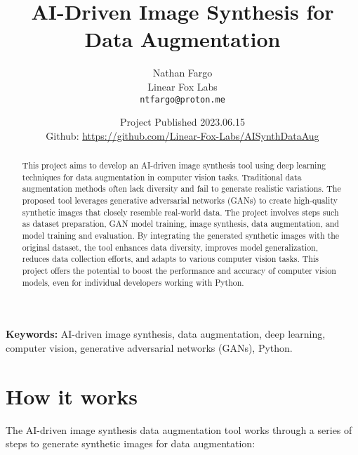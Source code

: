 \documentclass[11pt,a4paper]{article}
\title{AI-Driven Image Synthesis for Data Augmentation}
\author{Nathan Fargo\\
Linear Fox Labs\\
\texttt{ntfargo@proton.me}}
\date{Project Published 2023.06.15\\
Github: \url{https://github.com/Linear-Fox-Labs/AISynthDataAug}}
\begin{document}
 

\maketitle

\begin{abstract}
This project aims to develop an AI-driven image synthesis tool using deep learning techniques for data augmentation in computer vision tasks. Traditional data augmentation methods often lack diversity and fail to generate realistic variations. The proposed tool leverages generative adversarial networks (GANs) to create high-quality synthetic images that closely resemble real-world data. The project involves steps such as dataset preparation, GAN model training, image synthesis, data augmentation, and model training and evaluation. By integrating the generated synthetic images with the original dataset, the tool enhances data diversity, improves model generalization, reduces data collection efforts, and adapts to various computer vision tasks. This project offers the potential to boost the performance and accuracy of computer vision models, even for individual developers working with Python.
\end{abstract}

\noindent\textbf{Keywords:} AI-driven image synthesis, data augmentation, deep learning, computer vision, generative adversarial networks (GANs), Python.

\section{How it works}

The AI-driven image synthesis data augmentation tool works through a series of steps to generate synthetic images for data augmentation:
\end{document}
